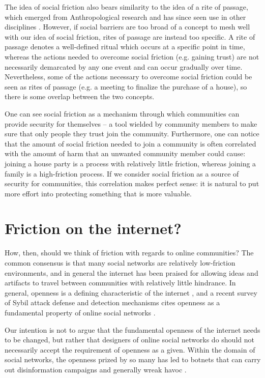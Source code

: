\documentclass[sigconf,authordraft]{acmart}
\begin{document}
The idea of social friction also bears similarity to the idea of a rite of passage, which emerged from Anthropological research and has since seen use in other disciplines \cite{blackwell_ROP,guha2011routledge}. However, if social barriers are too broad of a concept to mesh well with our idea of social friction, rites of passage are instead too specific. A rite of passage denotes a well-defined ritual which occurs at a specific point in time, whereas the actions needed to overcome social friction (e.g. gaining trust) are not necessarily demarcated by any one event and can occur gradually over time. Nevertheless, some of the actions necessary to overcome social friction could be seen as rites of passage (e.g. a meeting to finalize the purchase of a house), so there is some overlap between the two concepts. 

One can see social friction as a mechanism through which communities can provide security for themselves -- a tool wielded by community members to make sure that only people they trust join the community. Furthermore, one can notice that the amount of social friction needed to join a community is often correlated with the amount of harm that an unwanted community member could cause: joining a house party is a process with relatively little friction, whereas joining a family is a high-friction process. If we consider social friction as a source of security for communities, this correlation makes perfect sense: it is natural to put more effort into protecting something that is more valuable.

\section{Friction on the internet?}

How, then, should we think of friction with regards to online communities? The common consensus is that many social networks are relatively low-friction environments, and in general the internet has been praised for allowing ideas and artifacts to travel between communities with relatively little hindrance. In general, openness is a defining characteristic of the internet \cite{bechmann2014ubiquitous, lessig2002future}, and a recent survey of Sybil attack defense and detection mechanisms cites openness as a fundamental property of online social networks \cite{al2017sybil}.

Our intention is not to argue that the fundamental openness of the internet needs to be changed, but rather that designers of online social networks do should not necessarily accept the requirement of openness as a given. Within the domain of social networks, the openness prized by so many has led to botnets that can carry out disinformation campaigns and generally wreak havoc \cite{boshmaf2013design, kramer2014experimental, wu2013detecting, messias2013you, benkler2018network, bessi2016social}. 
\end{document}

